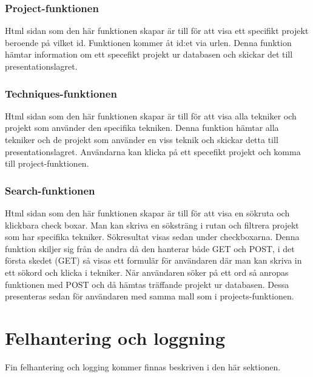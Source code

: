 \documentclass{TDP003mall}
\begin{document}
\subsubsection{Project-funktionen}
Html sidan som den här funktionen skapar är till för att visa ett specifikt projekt beroende på vilket id. Funktionen kommer åt id:et via urlen.
Denna funktion hämtar information om ett specefikt projekt ur databasen och skickar det till presentationslagret. 

\subsubsection{Techniques-funktionen}
Html sidan som den här funktionen skapar är till för att visa alla tekniker och projekt som använder den specifika tekniken. 
Denna funktion hämtar alla tekniker och de projekt som använder en viss teknik och skickar detta till presentationslagret. Användarna kan klicka på ett specefikt projekt och komma till project-funktionen. 

\subsubsection{Search-funktionen}
Html sidan som den här funktionen skapar är till för att visa en sökruta och klickbara check boxar. Man kan skriva en söksträng i rutan och filtrera projekt som har specifika tekniker. Sökresultat visas sedan under checkboxarna.
Denna funktion skiljer sig från de andra då den hanterar både GET och POST, i det första skedet (GET) så visas ett formulär för användaren där man kan skriva in ett sökord och klicka i tekniker. När användaren söker på ett ord så anropas funktionen med POST och då hämtas träffande projekt ur databasen. Dessa presenteras sedan för användaren med samma mall som i projects-funktionen.   

\section{Felhantering och loggning}
Fin felhantering och logging kommer finnas beskriven i den här sektionen.
\end{document}
